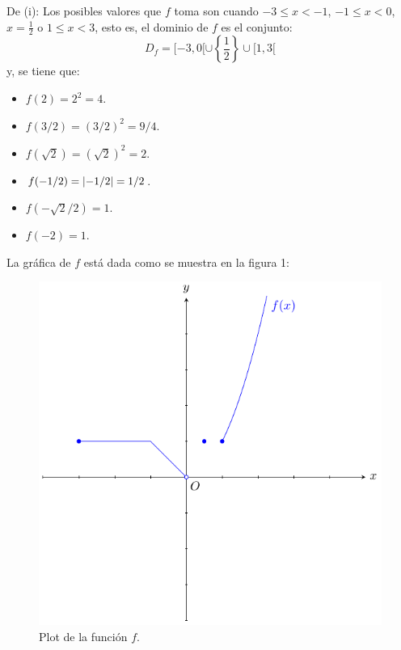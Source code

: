 \documentclass[12pt]{article}
\begin{document}
\begin{enumerate}
    \begin{sol}
        De (i): Los posibles valores que $f$ toma son cuando $-3\leq x <-1$, $-1\leq x<0$, $x=\frac{1}{2}$ o $1\leq x<3$, esto es, el dominio de $f$ es el conjunto:
        \begin{equation*}
            D_f=[-3,0[\cup\left\{\frac{1}{2}\right\}\cup[1,3[
        \end{equation*}
        y, se tiene que:
        \begin{itemize}
            \item $f(2)=2^2=4$.
            \item $f(3/2)=\left(3/2\right)^2=9/4$.
            \item $f(\sqrt{2})=\left(\sqrt{2} \right)^2=2$.
            \item $f(-1/2)=\left| -1/2 \right|=1/2$.
            \item $f(-\sqrt{2}/2)=1$.
            \item $f(-2)=1$.
        \end{itemize}
        La gráfica de $f$ está dada como se muestra en la figura 1:
        \begin{figure}
            \begin{center}
                \includegraphics[scale=1]{images/3_1.pdf}
            \end{center}
            \caption{Plot de la función $f$.}
        \end{figure}


\end{sol}
\end{enumerate}
\end{document}
